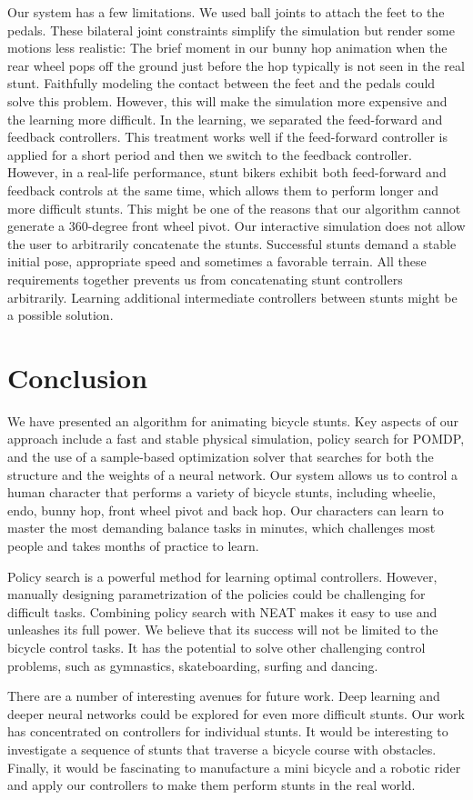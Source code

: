 Our system has a few limitations. We used ball joints to attach the feet to the pedals. These bilateral joint constraints simplify the simulation but render some motions less realistic: The brief moment in our bunny hop animation when the rear wheel pops off the ground just before the hop typically is not seen in the real stunt. Faithfully modeling the contact between the feet and the pedals could solve this problem. However, this will make the simulation more expensive and the learning more difficult. In the learning, we separated the feed-forward and feedback controllers. This treatment works well if the feed-forward controller is applied for a short period and then we switch to the feedback controller. However, in a real-life performance, stunt bikers exhibit both feed-forward and feedback controls at the same time, which allows them to perform longer and more difficult stunts. This might be one of the reasons that our algorithm cannot generate a 360-degree front wheel pivot. Our interactive simulation does not allow the user to arbitrarily concatenate the stunts. Successful stunts demand a stable initial pose, appropriate speed and sometimes a favorable terrain. All these requirements together prevents us from concatenating stunt controllers arbitrarily. Learning additional intermediate controllers between stunts might be a possible solution.

\section{Conclusion}

We have presented an algorithm for animating bicycle stunts.  Key aspects of our approach include a fast and stable physical simulation,
policy search for POMDP, and
the use of a sample-based optimization solver that searches for both the structure and the weights of a neural network.
Our system allows us to control a human character that
performs a variety of bicycle stunts, including wheelie, endo, bunny hop, front wheel pivot and back hop.
Our characters can learn to master the most demanding balance tasks in minutes, which challenges most people and takes months of practice to learn.

Policy search is a powerful method for learning optimal controllers. However, manually designing parametrization of the policies could be challenging for difficult tasks. Combining policy search with NEAT makes it easy to use and unleashes its full power. We believe that its success will not be limited to the bicycle control tasks. It has the potential to solve other challenging control problems, such as gymnastics, skateboarding, surfing and dancing.

There are a number of interesting avenues for future work. Deep learning \cite{Hinton:2007} and deeper neural networks could be explored for even more difficult stunts. Our work has concentrated on controllers for individual stunts. It would be interesting to investigate a sequence of stunts that traverse a bicycle course with obstacles. Finally, it would be fascinating to manufacture a mini bicycle and a robotic rider and apply our controllers to make them perform stunts in the real world.
